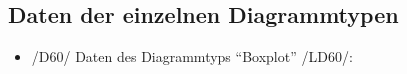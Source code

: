 \subsection{Daten der einzelnen Diagrammtypen}
\label{subsec:daten-diagrammtypen}

\begin{itemize}
	\item /D60/ Daten des Diagrammtyps "`Boxplot"' /LD60/:
\end{itemize}